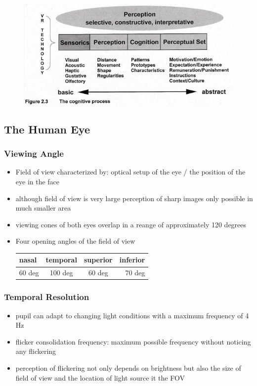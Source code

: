 \documentclass{standalone}
\begin{document}
\begin{figure}[H]
\centering
\includegraphics[width = 0.7\linewidth]{Figures/2_3.png}
\end{figure}
\subsection{The Human Eye}
\subsubsection{Viewing Angle}
\begin{itemize}
	\item Field of view characterized by: optical setup of the eye / the position of the eye in the face
	\item although field of view is very large perception of sharp images only possible in much smaller area
	\item viewing cones of both eyes overlap in a reange of approximately 120 degrees
	\item Four opening angles of the field of view
\begin{table}[H]
\centering
\begin{tabular}{|l|c|c|r|}
\hline
 nasal & temporal & superior & inferior \\ \hline
60 deg & 100 deg & 60 deg & 70 deg \\ \hline
\end{tabular}
\end{table}
\end{itemize}
\subsubsection{Temporal Resolution}
\begin{itemize}
	\item pupil can adapt to changing light conditions with a maximum frequency of 4 Hz	
	\item flicker consolidation frequency: maximum possible frequency without noticing any flickering
	\item perception of flickering not only depends on brightness but also the size of field of view and the location of light source it the FOV
\end{itemize}
\end{document}
